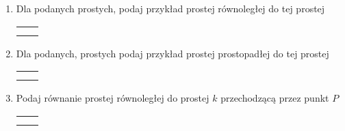 \documentclass[12pt,a4paper]{article}
\begin{document}
\begin{enumerate}[1.]
 	 \begin{enumerate}[a)] \begin{tabular}{p{7cm} p{7cm}}
 			\item $y=2x+5$& \item $y=-3x+8$ \\
 			\item $y=\sqrt{2}x-3\sqrt{5}$& \item $y=\frac{1}{2}x+1\frac{3}{4}$ \\
 			\item $y=(3\sqrt{2}-2\sqrt{3})x+5$& \item $y=3x+6-\sqrt{10}x$ \\
 	\end{tabular} \end{enumerate}
 	
 	\item Dla podanych prostych, podaj przykład prostej równoległej do tej prostej
 	
 	\begin{enumerate}[a)] \begin{tabular}{p{7cm} p{7cm}}
 			\item $y=-2x+1$& \item $y=x+12$ \\
 			\item $y=\frac{2}{3}x+2$& \item $y=-\frac{1}{3}x+8$ \\
 	\end{tabular} \end{enumerate}
 	
 	\item Dla podanych, prostych podaj przykład prostej prostopadłej do tej prostej
 	
 	\begin{enumerate}[a)] \begin{tabular}{p{7cm} p{7cm}}
		\item $y=-2x+1$& \item $y=x+12$ \\
		\item $y=\frac{2}{3}x+2$& \item $y=-\frac{1}{3}x+8$ \\
	\end{tabular} \end{enumerate}

 	
 	\item Podaj równanie prostej równoległej do prostej $k$ przechodzącą przez punkt $P$
 	
 	\begin{enumerate}[a)] \begin{tabular}{p{7cm} p{7cm}}
 			\item $k:y=3x+1$, $P=(2,9)$& \item $k:y=\frac{1}{2}x+4$, $P=(-4,5)$ \\
 			\item $k:y=-x-5$, $P=(-3,4)$& \item $k:y=\frac{3}{5}x-3\sqrt{2}$, $P=(10,10)$ \\
 	\end{tabular} \end{enumerate}
 	

\end{enumerate}
\end{document}
